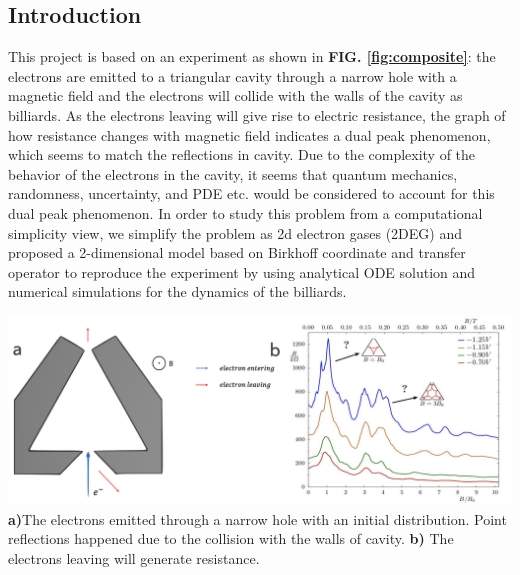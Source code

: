\documentclass[a0,portrait]{a0poster}
\begin{document}
\begin{multicols}{3} %

\section*{Introduction}
\noindent
This project is based on an experiment \cite{richterklassischer} as shown in \textbf{FIG. \ref{fig:composite}}: the electrons \cite{boggild1999magnetic} are emitted to a triangular cavity through a narrow hole with a magnetic field and the electrons will collide with the walls of the cavity as billiards. As the electrons leaving will give rise to electric resistance, the graph of how resistance changes with magnetic field indicates a dual peak phenomenon, which seems to match the reflections in cavity. Due to the complexity of the behavior of the electrons in the cavity, it seems that quantum mechanics, randomness, uncertainty, and PDE etc. would be considered to account for this dual peak phenomenon. In order to study this problem from a computational simplicity view, we simplify the problem as 2d electron gases (2DEG) and proposed a 2-dimensional model based on Birkhoff coordinate and transfer operator to reproduce the experiment by using analytical ODE solution and numerical simulations for the dynamics of the billiards.

\begin{center}\vspace{1cm}
    \includegraphics[width=0.8\linewidth]{composite.png}
     \textbf{a)}The electrons emitted through a narrow hole with an initial distribution. Point reflections happened due to the collision with the walls of cavity. \textbf{b)} The electrons leaving will generate resistance.
    \label{fig:composite}
\end{center}%


\end{multicols}
\end{document}
